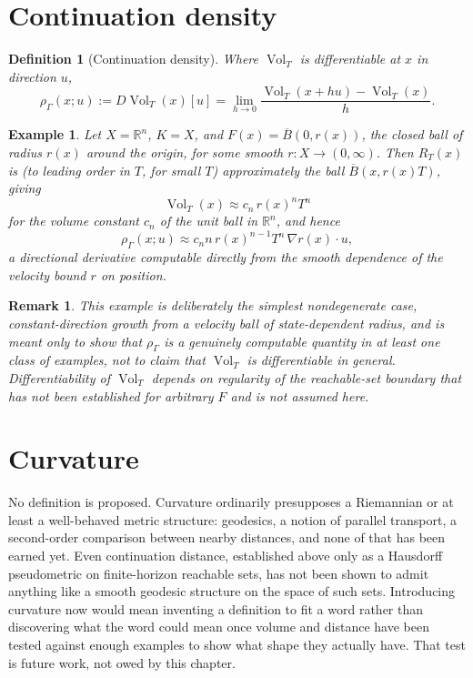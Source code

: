 \documentclass[11pt]{report}
\newtheorem{definition}{Definition}[chapter]
\newtheorem{remark}{Remark}[chapter]
\newtheorem{example}{Example}[chapter]
\begin{document}
\section*{Continuation density}

\begin{definition}[Continuation density]
Where $\operatorname{Vol}_T$ is differentiable at $x$ in direction $u$,
\[
\rho_\Gamma(x;u) := D\operatorname{Vol}_T(x)[u] = \lim_{h \to 0} \frac{\operatorname{Vol}_T(x+hu) - \operatorname{Vol}_T(x)}{h}.
\]
\end{definition}

\begin{example}
Let $X = \mathbb{R}^n$, $K = X$, and $F(x) = \overline{B}(0, r(x))$, the
closed ball of radius $r(x)$ around the origin, for some smooth
$r : X \to (0,\infty)$. Then $R_T(x)$ is (to leading order in $T$, for
small $T$) approximately the ball $\overline{B}(x, r(x)T)$, giving
\[
\operatorname{Vol}_T(x) \approx c_n\, r(x)^n T^n
\]
for the volume constant $c_n$ of the unit ball in $\mathbb{R}^n$, and
hence
\[
\rho_\Gamma(x;u) \approx c_n n\, r(x)^{n-1} T^n\, \nabla r(x) \cdot u,
\]
a directional derivative computable directly from the smooth dependence
of the velocity bound $r$ on position.
\end{example}

\begin{remark}
This example is deliberately the simplest nondegenerate case,
constant-direction growth from a velocity ball of state-dependent
radius, and is meant only to show that $\rho_\Gamma$ is a genuinely
computable quantity in at least one class of examples, not to claim
that $\operatorname{Vol}_T$ is differentiable in general. Differentiability
of $\operatorname{Vol}_T$ depends on regularity of the reachable-set
boundary that has not been established for arbitrary $F$ and is not
assumed here.
\end{remark}

\section*{Curvature}

No definition is proposed. Curvature ordinarily presupposes a
Riemannian or at least a well-behaved metric structure: geodesics,
a notion of parallel transport, a second-order comparison between
nearby distances, and none of that has been earned yet. Even
continuation distance, established above only as a Hausdorff
pseudometric on finite-horizon reachable sets, has not been shown to
admit anything like a smooth geodesic structure on the space of such
sets. Introducing curvature now would mean inventing a definition to
fit a word rather than discovering what the word could mean once volume
and distance have been tested against enough examples to show what
shape they actually have. That test is future work, not owed by this
chapter.
\end{document}
